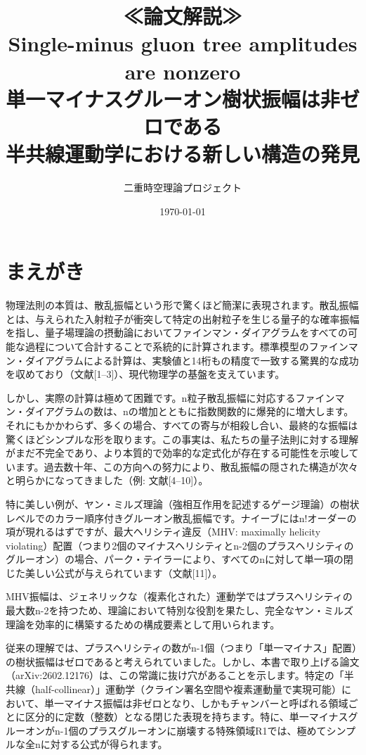 \documentclass[dvipdfmx,a4paper]{jsbook}
\title{\Huge ≪論文解説≫\\[2ex]
\Large Single-minus gluon tree amplitudes are nonzero\\
\Large 単一マイナスグルーオン樹状振幅は非ゼロである\\
\large 半共線運動学における新しい構造の発見}
\author{二重時空理論プロジェクト}
\date{\today}
\theoremstyle{definition}
\theoremstyle{remark}
\begin{document}
\frontmatter

\maketitle

\tableofcontents

\chapter{まえがき}

物理法則の本質は、散乱振幅という形で驚くほど簡潔に表現されます。散乱振幅とは、与えられた入射粒子が衝突して特定の出射粒子を生じる量子的な確率振幅を指し、量子場理論の摂動論においてファインマン・ダイアグラムをすべての可能な過程について合計することで系統的に計算されます。標準模型のファインマン・ダイアグラムによる計算は、実験値と14桁もの精度で一致する驚異的な成功を収めており（文献[1--3]）、現代物理学の基盤を支えています。

しかし、実際の計算は極めて困難です。n粒子散乱振幅に対応するファインマン・ダイアグラムの数は、nの増加とともに指数関数的に爆発的に増大します。それにもかかわらず、多くの場合、すべての寄与が相殺し合い、最終的な振幅は驚くほどシンプルな形を取ります。この事実は、私たちの量子法則に対する理解がまだ不完全であり、より本質的で効率的な定式化が存在する可能性を示唆しています。過去数十年、この方向への努力により、散乱振幅の隠された構造が次々と明らかになってきました（例: 文献[4--10]）。

特に美しい例が、ヤン・ミルズ理論（強相互作用を記述するゲージ理論）の樹状レベルでのカラー順序付きグルーオン散乱振幅です。ナイーブにはn!オーダーの項が現れるはずですが、最大ヘリシティ違反（MHV: maximally helicity violating）配置（つまり2個のマイナスヘリシティとn-2個のプラスヘリシティのグルーオン）の場合、パーク・テイラーにより、すべてのnに対して単一項の閉じた美しい公式が与えられています（文献[11]）。

MHV振幅は、ジェネリックな（複素化された）運動学ではプラスヘリシティの最大数n-2を持つため、理論において特別な役割を果たし、完全なヤン・ミルズ理論を効率的に構築するための構成要素として用いられます。

従来の理解では、プラスヘリシティの数がn-1個（つまり「単一マイナス」配置）の樹状振幅はゼロであると考えられていました。しかし、本書で取り上げる論文（arXiv:2602.12176）は、この常識に抜け穴があることを示します。特定の「半共線（half-collinear）」運動学（クライン署名空間や複素運動量で実現可能）において、単一マイナス振幅は非ゼロとなり、しかもチャンバーと呼ばれる領域ごとに区分的に定数（整数）となる閉じた表現を持ちます。特に、単一マイナスグルーオンがn-1個のプラスグルーオンに崩壊する特殊領域R1では、極めてシンプルな全nに対する公式が得られます。
\end{document}
